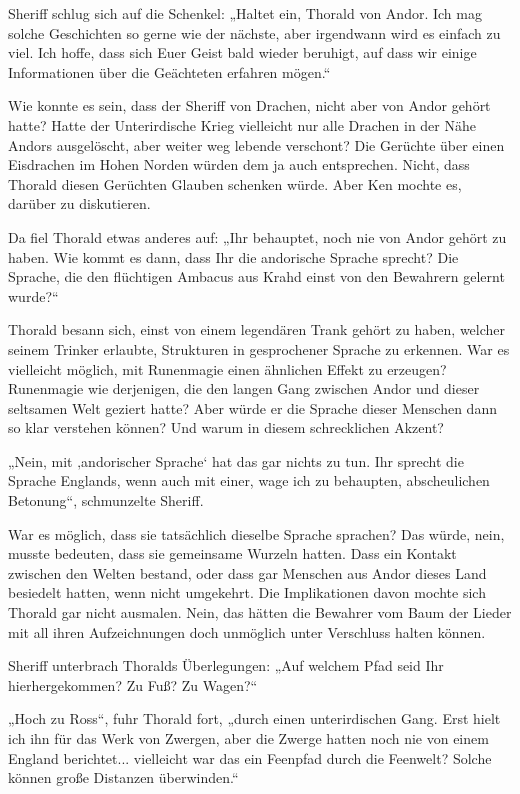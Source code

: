 \documentclass[10pt, a4paper, oneside]{book}
\begin{document}
Sheriff schlug sich auf die Schenkel: „Haltet ein, Thorald von Andor. Ich mag solche Geschichten so gerne wie der nächste, aber irgendwann wird es einfach zu viel. Ich hoffe, dass sich Euer Geist bald wieder beruhigt, auf dass wir einige Informationen über die Geächteten erfahren mögen.“

Wie konnte es sein, dass der Sheriff von Drachen, nicht aber von Andor gehört hatte? Hatte der Unterirdische Krieg vielleicht nur alle Drachen in der Nähe Andors ausgelöscht, aber weiter weg lebende verschont? Die Gerüchte über einen Eisdrachen im Hohen Norden würden dem ja auch entsprechen. Nicht, dass Thorald diesen Gerüchten Glauben schenken würde. Aber Ken mochte es, darüber zu diskutieren.

Da fiel Thorald etwas anderes auf: „Ihr behauptet, noch nie von Andor gehört zu haben. Wie kommt es dann, dass Ihr die andorische Sprache sprecht? Die Sprache, die den flüchtigen Ambacus aus Krahd einst von den Bewahrern gelernt wurde?“

Thorald besann sich, einst von einem legendären Trank gehört zu haben, welcher seinem Trinker erlaubte, Strukturen in gesprochener Sprache zu erkennen. War es vielleicht möglich, mit Runenmagie einen ähnlichen Effekt zu erzeugen? Runenmagie wie derjenigen, die den langen Gang zwischen Andor und dieser seltsamen Welt geziert hatte? Aber würde er die Sprache dieser Menschen dann so klar verstehen können? Und warum in diesem schrecklichen Akzent?

„Nein, mit ‚andorischer Sprache‘ hat das gar nichts zu tun. Ihr sprecht die Sprache Englands, wenn auch mit einer, wage ich zu behaupten, abscheulichen Betonung“, schmunzelte Sheriff.

War es möglich, dass sie tatsächlich dieselbe Sprache sprachen? Das würde, nein, musste bedeuten, dass sie gemeinsame Wurzeln hatten. Dass ein Kontakt zwischen den Welten bestand, oder dass gar Menschen aus Andor dieses Land besiedelt hatten, wenn nicht umgekehrt. Die Implikationen davon mochte sich Thorald gar nicht ausmalen. Nein, das hätten die Bewahrer vom Baum der Lieder mit all ihren Aufzeichnungen doch unmöglich unter Verschluss halten können.

Sheriff unterbrach Thoralds Überlegungen: „Auf welchem Pfad seid Ihr hierhergekommen? Zu Fuß? Zu Wagen?“

„Hoch zu Ross“, fuhr Thorald fort, „durch einen unterirdischen Gang. Erst hielt ich ihn für das Werk von Zwergen, aber die Zwerge hatten noch nie von einem England berichtet... vielleicht war das ein Feenpfad durch die Feenwelt? Solche können große Distanzen überwinden.“
\end{document}
